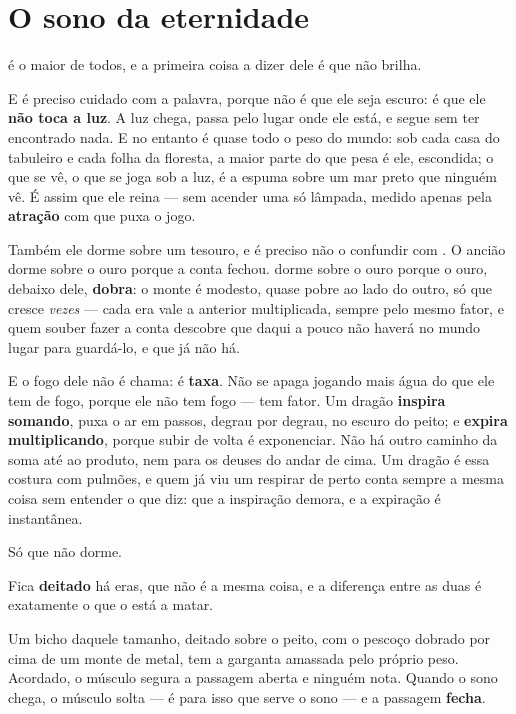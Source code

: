 \documentclass[livro.tex]{subfiles}
\begin{document}
\chapter{O sono da eternidade}

\Ven é o maior de todos, e a primeira coisa a dizer dele é que não brilha.

E é preciso cuidado com a palavra, porque não é que ele seja escuro: é que ele \textbf{não toca a
luz}. A luz chega, passa pelo lugar onde ele está, e segue sem ter encontrado nada. E no entanto
é quase todo o peso do mundo: sob cada casa do tabuleiro e cada folha da floresta, a maior parte
do que pesa é ele, escondida; o que se vê, o que se joga sob a luz, é a espuma sobre um mar preto
que ninguém vê. É assim que ele reina --- sem acender uma só lâmpada, medido apenas pela
\textbf{atração} com que puxa o jogo.

Também ele dorme sobre um tesouro, e é preciso não o confundir com \Odo . O ancião dorme sobre o
ouro porque a conta fechou. \Ven dorme sobre o ouro porque o ouro, debaixo dele, \textbf{dobra}:
o monte é modesto, quase pobre ao lado do outro, só que cresce \emph{vezes} --- cada era vale a
anterior multiplicada, sempre pelo mesmo fator, e quem souber fazer a conta descobre que daqui a
pouco não haverá no mundo lugar para guardá-lo, e que já não há.

E o fogo dele não é chama: é \textbf{taxa}. Não se apaga jogando mais água do que ele tem de
fogo, porque ele não tem fogo --- tem fator. Um dragão \textbf{inspira somando}, puxa o ar em
passos, degrau por degrau, no escuro do peito; e \textbf{expira multiplicando}, porque subir de
volta é exponenciar. Não há outro caminho da soma até ao produto, nem para os deuses do andar
de cima. Um dragão é essa costura com pulmões, e quem já viu um respirar de perto conta sempre a
mesma coisa sem entender o que diz: que a inspiração demora, e a expiração é instantânea.

\medskip

Só que \Ven não dorme.

Fica \textbf{deitado} há eras, que não é a mesma coisa, e a diferença entre as duas é exatamente
o que o está a matar.

\medskip

Um bicho daquele tamanho, deitado sobre o peito, com o pescoço dobrado por cima de um monte de
metal, tem a garganta amassada pelo próprio peso. Acordado, o músculo segura a passagem aberta e
ninguém nota. Quando o sono chega, o músculo solta --- é para isso que serve o sono --- e a
passagem \textbf{fecha}.
\end{document}
